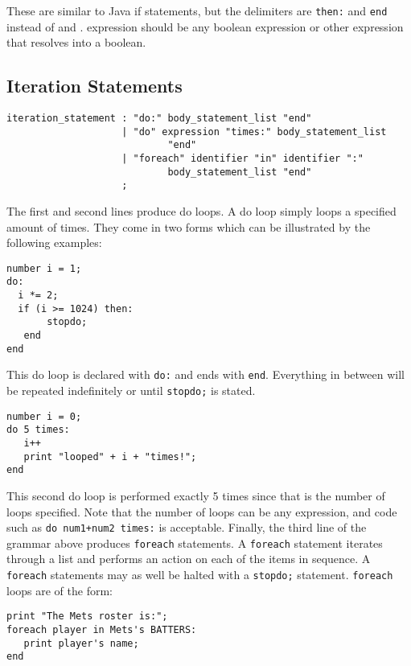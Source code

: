 These are similar to Java if statements, but the delimiters are
\texttt{then:} and \texttt{end} instead of { and }.  expression should
be any boolean expression or other expression that resolves into a
boolean.

\subsection{Iteration Statements}

\begin{verbatim}
iteration_statement : "do:" body_statement_list "end"
                    | "do" expression "times:" body_statement_list
                            "end"
                    | "foreach" identifier "in" identifier ":"
                            body_statement_list "end"
                    ;
\end{verbatim}

The first and second lines produce do loops. A do loop simply loops a
specified amount of times. They 
come in two forms which can be illustrated by the following examples: 

\begin{verbatim}
number i = 1;
do:
  i *= 2;
  if (i >= 1024) then:
       stopdo;
   end
end
\end{verbatim}

This do loop is declared with \texttt{do:} and ends with
\texttt{end}. Everything in between will be repeated indefinitely or
until \texttt{stopdo;} is stated.

\begin{verbatim}
number i = 0;
do 5 times:
   i++
   print "looped" + i + "times!";
end
\end{verbatim}

This second do loop is performed exactly 5 times since that is the
number of loops specified. Note that the number of loops can be any
expression, and code such as \texttt{do num1+num2 times:} is
acceptable.  Finally, the third line of the grammar above produces
\texttt{foreach} statements. A \texttt{foreach} statement iterates
through a list and performs an action on each of the items in
sequence. A \texttt{foreach} statements may as well be halted with a
\texttt{stopdo;} statement. \texttt{foreach} loops are of the form:

\begin{verbatim}
print "The Mets roster is:";
foreach player in Mets's BATTERS:
   print player's name;
end
\end{verbatim}
 
